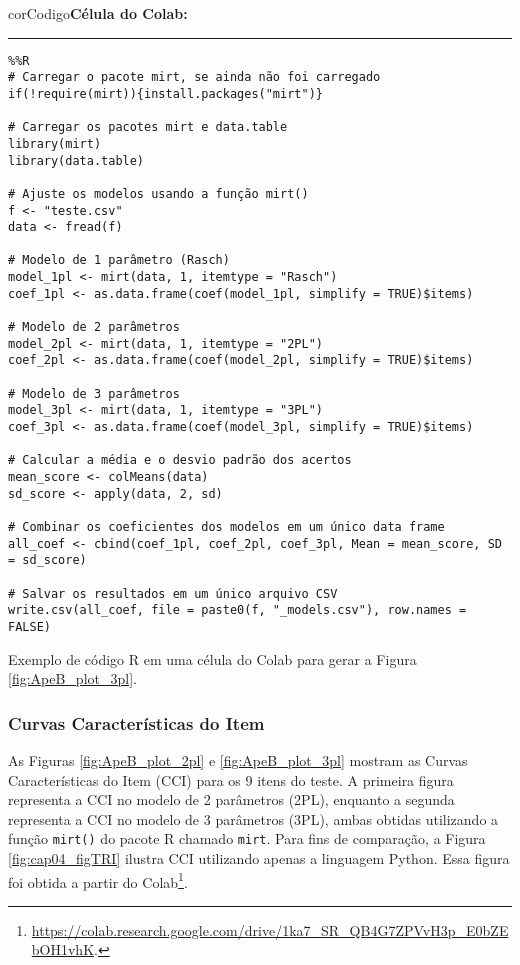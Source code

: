 \renewcommand{\thelisting}{\thechapter.\arabic{listing}} %


\begin{listing}[!ht]
    \begin{myboxCode}{corCodigo}{\textbf{Célula do Colab: }}\vspace{3mm}
    \hrule
    \begin{verbatim}
%%R
# Carregar o pacote mirt, se ainda não foi carregado
if(!require(mirt)){install.packages("mirt")}

# Carregar os pacotes mirt e data.table
library(mirt)
library(data.table)

# Ajuste os modelos usando a função mirt()
f <- "teste.csv"
data <- fread(f)

# Modelo de 1 parâmetro (Rasch)
model_1pl <- mirt(data, 1, itemtype = "Rasch")
coef_1pl <- as.data.frame(coef(model_1pl, simplify = TRUE)$items)

# Modelo de 2 parâmetros
model_2pl <- mirt(data, 1, itemtype = "2PL")
coef_2pl <- as.data.frame(coef(model_2pl, simplify = TRUE)$items)

# Modelo de 3 parâmetros
model_3pl <- mirt(data, 1, itemtype = "3PL")
coef_3pl <- as.data.frame(coef(model_3pl, simplify = TRUE)$items)

# Calcular a média e o desvio padrão dos acertos
mean_score <- colMeans(data)
sd_score <- apply(data, 2, sd)

# Combinar os coeficientes dos modelos em um único data frame
all_coef <- cbind(coef_1pl, coef_2pl, coef_3pl, Mean = mean_score, SD = sd_score)

# Salvar os resultados em um único arquivo CSV
write.csv(all_coef, file = paste0(f, "_models.csv"), row.names = FALSE)
\end{verbatim}
\end{myboxCode}
\caption{Exemplo de código R em uma célula do Colab para gerar a Figura \ref{fig:ApeB_plot_3pl}.}
\label{lst:tri_estatisticas}
\end{listing}

\subsubsection{Curvas Características do Item}\label{sec:apeB_cci}

As Figuras \ref{fig:ApeB_plot_2pl} e \ref{fig:ApeB_plot_3pl} mostram as Curvas  Características do Item (CCI) para os 9 itens do teste. A primeira figura representa a CCI no modelo de 2 parâmetros (2PL), enquanto a segunda representa a CCI no modelo de 3 parâmetros (3PL), ambas obtidas utilizando a função \verb|mirt()| do pacote R chamado \verb|mirt|. Para fins de comparação, a Figura \ref{fig:cap04_figTRI} ilustra CCI utilizando apenas a linguagem Python. Essa figura foi obtida a partir do Colab\footnote{\url{https://colab.research.google.com/drive/1ka7_SR_QB4G7ZPVvH3p_E0bZEbOH1vhK}.}.

